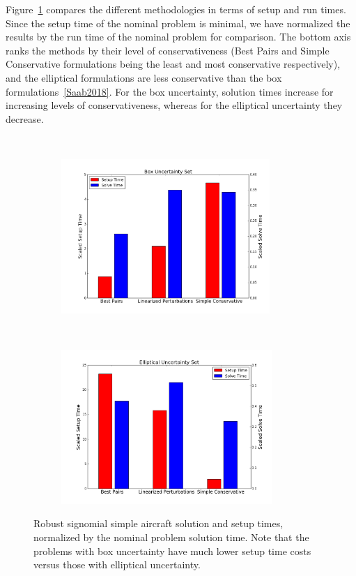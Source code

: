 Figure~\ref{compare_signomial} compares the different methodologies in terms of setup and
run times. Since the setup time of the nominal problem is minimal, we have
normalized the results by the run time of the nominal problem for comparison.
The bottom axis ranks the methods by their level of conservativeness (Best Pairs
and Simple Conservative formulations being the least and most conservative respectively),
and the elliptical formulations are less conservative than the box formulations~\ref{Saab2018}.
For the box uncertainty, solution times increase for increasing levels of conservativeness,
whereas for the elliptical uncertainty they decrease.

\ \\
\begin{figure}[ht]
    \centering
    \captionsetup{justification=centering, font=small}
    \begin{subfigure}{0.49\textwidth}
        \centering
        \includegraphics[height=2.3in]{signomial_simple_flight/box_times.png}
    \end{subfigure}
    ~
    \begin{subfigure}{0.49\textwidth}
        \centering
        \includegraphics[height=2.3in]{signomial_simple_flight/ell_times.png}
    \end{subfigure}
    \caption{Robust signomial simple aircraft solution and setup times, normalized by the
    nominal problem solution time. Note that the problems with box uncertainty have much lower setup
    time costs versus those with elliptical uncertainty.}
    \label{compare_signomial}
\end{figure}


